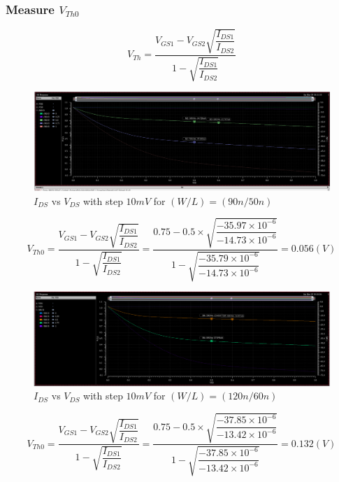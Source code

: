 \subsubsection{Measure $V_{Th0}$}
\[ V_{Th} = \dfrac{V_{GS1} - V_{GS2}\sqrt{\dfrac{I_{DS1}}{I_{DS2}}}}{1 - \sqrt{\dfrac{I_{DS1}}{I_{DS2}}}} \]


\begin{figure}[H]
	\centering
	\includegraphics[width=.6\linewidth]{sections/pic/EX3_PMOS_vth0_(w_l)(90_50).png}
	\caption{$I_{DS}$ vs $V_{DS}$ with step $10mV$ for $(W/L) = (90n/50n)$}
	\label{f_EX3_PMOS_vth0_(w_l)(90_50)}
\end{figure}

\[ V_{Th0} = \dfrac{V_{GS1} - V_{GS2}\sqrt{\dfrac{I_{DS1}}{I_{DS2}}}}{1 - \sqrt{\dfrac{I_{DS1}}{I_{DS2}}}} = \dfrac{0.75 - 0.5\times \sqrt{\dfrac{-35.97\times 10^{-6}}{-14.73\times 10^{-6}}}}{1 - \sqrt{\dfrac{-35.79\times 10^{-6}}{-14.73\times 10^{-6}}}} = 0.056(V)\]


\begin{figure}[H]
	\centering
	\includegraphics[width=.6\linewidth]{sections/pic/EX3_PMOS_vth0_(w_l)(120_60).png}
	\caption{$I_{DS}$ vs $V_{DS}$ with step $10mV$ for $(W/L) = (120n/60n)$}
	\label{f_EX3_PMOS_vth0_(w_l)(120_60)}
\end{figure}

\[ V_{Th0} = \dfrac{V_{GS1} - V_{GS2}\sqrt{\dfrac{I_{DS1}}{I_{DS2}}}}{1 - \sqrt{\dfrac{I_{DS1}}{I_{DS2}}}} = \dfrac{0.75 - 0.5\times \sqrt{\dfrac{-37.85\times 10^{-6}}{-13.42\times 10^{-6}}}}{1 - \sqrt{\dfrac{-37.85\times 10^{-6}}{-13.42\times 10^{-6}}}} = 0.132(V)\] 


%
%

